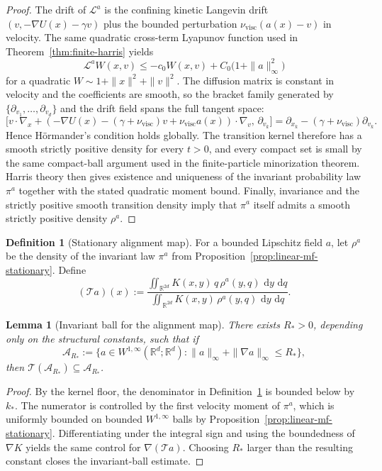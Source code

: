 \documentclass[11pt]{article}
\newtheorem{lemma}[theorem]{Lemma}
\theoremstyle{definition}
\newtheorem{definition}[theorem]{Definition}
\theoremstyle{remark}
\newcommand{\R}{\mathbb{R}}
\newcommand{\dd}{\,\mathrm{d}}
\begin{document}
\begin{proof}
The drift of \(\mathcal L^a\) is the confining kinetic Langevin drift
\((v,-\nabla U(x)-\gamma v)\) plus the bounded perturbation
\(\nu_{\mathrm{visc}}(a(x)-v)\) in velocity. The same quadratic cross-term
Lyapunov function used in Theorem~\ref{thm:finite-harris} yields
\[
\mathcal L^a W(x,v)\le -c_0 W(x,v)+C_0\bigl(1+\|a\|_\infty^2\bigr)
\]
for a quadratic \(W\sim 1+\|x\|^2+\|v\|^2\). The diffusion matrix is constant in
velocity and the coefficients are smooth, so the bracket family generated by
\(\{\partial_{v_1},\dots,\partial_{v_d}\}\) and the drift field spans the full
tangent space:
\[
\bigl[v\cdot \nabla_x
+(-\nabla U(x)-(\gamma+\nu_{\mathrm{visc}})v+\nu_{\mathrm{visc}}a(x))\cdot\nabla_v,\,
\partial_{v_k}\bigr]
=
\partial_{x_k}-(\gamma+\nu_{\mathrm{visc}})\partial_{v_k}.
\]
Hence Hörmander's condition holds globally. The transition kernel therefore has
a smooth strictly positive density for every \(t>0\), and every compact set is
small by the same compact-ball argument used in the finite-particle
minorization theorem. Harris theory then gives existence and uniqueness of the
invariant probability law \(\pi^a\) together with the stated quadratic moment
bound. Finally, invariance and the strictly positive smooth transition density
imply that \(\pi^a\) itself admits a smooth strictly positive density
\(\rho^a\).
\end{proof}

\begin{definition}[Stationary alignment map]\label{def:mf-alignment-map}
For a bounded Lipschitz field \(a\), let \(\rho^a\) be the density of the
invariant law \(\pi^a\) from Proposition~\ref{prop:linear-mf-stationary}. Define
\[
(\mathcal T a)(x)
:=
\frac{\iint_{\R^{2d}} K(x,y)\,q\,\rho^a(y,q)\,\dd y\,\dd q}
{\iint_{\R^{2d}} K(x,y)\,\rho^a(y,q)\,\dd y\,\dd q}.
\]
\end{definition}

\begin{lemma}[Invariant ball for the alignment map]\label{lem:mf-map-ball}
There exists \(R_*>0\), depending only on the structural constants, such that
if
\[
\mathcal A_{R_*}
:=
\{a\in W^{1,\infty}(\R^d;\R^d):\|a\|_\infty+\|\nabla a\|_\infty\le R_*\},
\]
then \(\mathcal T(\mathcal A_{R_*})\subseteq \mathcal A_{R_*}\).
\end{lemma}

\begin{proof}
By the kernel floor, the denominator in Definition~\ref{def:mf-alignment-map} is
bounded below by \(k_*\). The numerator is controlled by the first velocity
moment of \(\pi^a\), which is uniformly bounded on bounded \(W^{1,\infty}\)
balls by Proposition~\ref{prop:linear-mf-stationary}. Differentiating under the
integral sign and using the boundedness of \(\nabla K\) yields the same control
for \(\nabla(\mathcal T a)\). Choosing \(R_*\) larger than the resulting
constant closes the invariant-ball estimate.
\end{proof}
\end{document}
